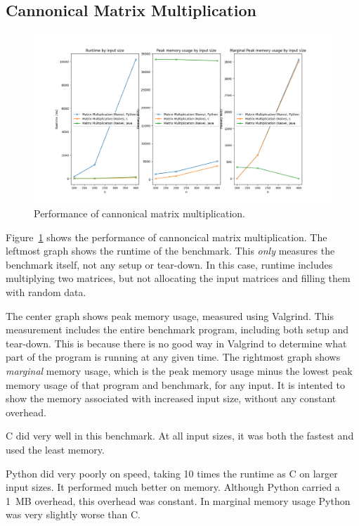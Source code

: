 \documentclass[12pt,letterpaper]{article}
\begin{document}
\subsection{Cannonical Matrix Multiplication}\label{matmul-cannonical}

\begin{figure}[H]
  \centering
  \includegraphics[width=\textwidth]{./matmul_naïve-plot.png}
  \caption{Performance of cannonical matrix multiplication.}
  \label{plot-matmul-cannonical}
\end{figure}

Figure~\ref{plot-matmul-cannonical} shows the performance of cannoncical matrix
multiplication. The leftmost graph shows the runtime of the benchmark. This
\emph{only} measures the benchmark itself, not any setup or tear-down. In this
case, runtime includes multiplying two matrices, but not allocating the input
matrices and filling them with random data.

The center graph shows peak memory usage, measured using Valgrind. This
measurement includes the entire benchmark program, including both setup and
tear-down. This is because there is no good way in Valgrind to determine what
part of the program is running at any given time. The rightmost graph shows
\emph{marginal} memory usage, which is the peak memory usage minus the lowest
peak memory usage of that program and benchmark, for any input. It is intented
to show the memory associated with increased input size, without any constant
overhead.

C did very well in this benchmark. At all input sizes, it was both the fastest
and used the least memory.

Python did very poorly on speed, taking 10 times the runtime as C on larger
input sizes. It performed much better on memory. Although Python carried a
\SI{1}{\mega B} overhead, this overhead was constant. In marginal memory usage
Python was very slightly worse than C.
\end{document}
